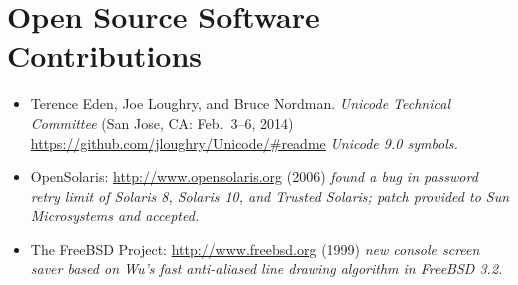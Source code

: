\section*{Open Source Software Contributions}
\vspace{-3mm}

\begin{itemize}
	\item Terence Eden, Joe Loughry, and Bruce Nordman. \emph{Unicode
		Technical Committee} (San Jose, CA: Feb.\ 3--6, 2014)
		\url{https://github.com/jloughry/Unicode/#readme}
    \emph{Unicode 9.0 symbols.}\vspace{-2.5mm}
	\item OpenSolaris: \url{http://www.opensolaris.org} (2006)
		\emph{found a bug in password retry limit of Solaris 8, Solaris 10,
		and Trusted Solaris; patch provided to Sun Microsystems and
    accepted.}\vspace{-2.5mm}
	\item The FreeBSD Project: \url{http://www.freebsd.org} (1999)
		\emph{new console screen saver based on Wu's fast
		anti-aliased line drawing algorithm in FreeBSD 3.2.} %
\end{itemize}


